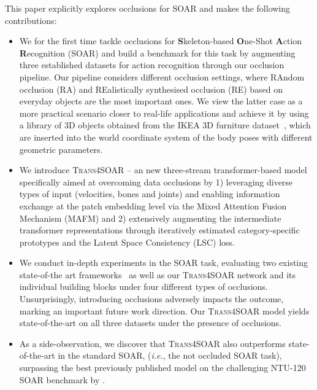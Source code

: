 \documentclass[lettersize,journal]{IEEEtran}
\begin{document}
This paper explicitly explores occlusions for SOAR and makes the following contributions:
\begin{itemize}
    \item We for the first time tackle occlusions for \textbf{S}keleton-based \textbf{O}ne-Shot \textbf{A}ction \textbf{R}ecognition (SOAR) and build a benchmark for this task by augmenting three established datasets for action recognition through our occlusion pipeline. Our pipeline considers different occlusion settings, where RAndom occlusion (RA) and REalistically synthesised occlusion (RE) based on everyday objects are the most important ones. We view the latter case as a more practical scenario closer to real-life applications and achieve it by using a library of 3D objects obtained from the IKEA 3D furniture dataset~\cite{sun2018pix3d}, which are inserted into the world coordinate system of the body poses with different geometric parameters.

    \item We introduce \textsc{Trans4SOAR} -- an new three-stream transformer-based model specifically aimed at overcoming data occlusions by 1) leveraging diverse types of input (velocities, bones and joints) and enabling information exchange at the patch embedding level via the Mixed Attention Fusion Mechanism (MAFM) and 2) extensively augmenting the intermediate transformer representations through iteratively estimated category-specific prototypes and the Latent Space Consistency (LSC) loss.
     
    \item  We conduct in-depth experiments in the SOAR task, evaluating two existing state-of-the art frameworks~\cite{memmesheimer2021sl, memmesheimer2020skeleton_dml} as well as our \textsc{Trans4SOAR} network and its individual building blocks under four different types of occlusions. Unsurprisingly, introducing occlusions adversely impacts the outcome, marking an important future work direction. Our \textsc{Trans4SOAR} model yields state-of-the-art on all three datasets under the presence of occlusions.
    
    \item As a side-observation, we discover that \textsc{Trans4SOAR} also outperforms state-of-the-art in the standard SOAR, (\textit{i.e.}, the not occluded SOAR task), surpassing the best previously published model on the challenging NTU-120 SOAR benchmark by .
\end{itemize}
\end{document}
